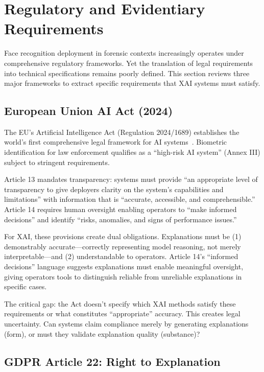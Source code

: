 \section{Regulatory and Evidentiary Requirements}

Face recognition deployment in forensic contexts increasingly operates under comprehensive regulatory frameworks. Yet the translation of legal requirements into technical specifications remains poorly defined. This section reviews three major frameworks to extract specific requirements that XAI systems must satisfy.

\subsection{European Union AI Act (2024)}

The EU's Artificial Intelligence Act (Regulation 2024/1689) establishes the world's first comprehensive legal framework for AI systems~\cite{euaiact2024}. Biometric identification for law enforcement qualifies as a ``high-risk AI system'' (Annex III) subject to stringent requirements.

Article 13 mandates transparency: systems must provide ``an appropriate level of transparency to give deployers clarity on the system's capabilities and limitations'' with information that is ``accurate, accessible, and comprehensible.'' Article 14 requires human oversight enabling operators to ``make informed decisions'' and identify ``risks, anomalies, and signs of performance issues.''

For XAI, these provisions create dual obligations. Explanations must be (1) demonstrably accurate—correctly representing model reasoning, not merely interpretable—and (2) understandable to operators. Article 14's ``informed decisions'' language suggests explanations must enable meaningful oversight, giving operators tools to distinguish reliable from unreliable explanations in specific cases.

The critical gap: the Act doesn't specify which XAI methods satisfy these requirements or what constitutes ``appropriate'' accuracy. This creates legal uncertainty. Can systems claim compliance merely by generating explanations (form), or must they validate explanation quality (substance)?

\subsection{GDPR Article 22: Right to Explanation}

